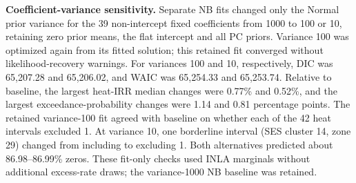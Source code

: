 \documentclass[10pt]{article}
\begin{document}
\textbf{Coefficient-variance sensitivity.}
Separate NB fits changed only the Normal prior variance for the 39
non-intercept fixed coefficients from 1000 to 100 or 10, retaining zero prior
means, the flat intercept and all PC priors. Variance 100 was optimized
again from its fitted solution; this retained fit converged without
likelihood-recovery warnings. For variances 100 and 10, respectively,
DIC was 65,207.28 and 65,206.02, and WAIC was 65,254.33 and 65,253.74.
Relative to baseline, the largest heat-IRR median changes were 0.77\% and
0.52\%, and the largest exceedance-probability changes were 1.14 and 0.81
percentage points. The retained variance-100 fit agreed with baseline on
whether each of the 42 heat intervals excluded 1. At variance 10, one borderline
interval (SES cluster 14, zone 29) changed from including to excluding 1.
Both alternatives predicted about 86.98--86.99\% zeros. These fit-only
checks used INLA marginals without additional excess-rate draws; the
variance-1000 NB baseline was retained.
\end{document}
